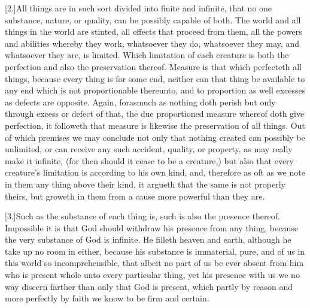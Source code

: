 [2.]All things are in such sort divided into finite and infinite, that no one substance, nature, or quality, can be possibly capable of both. The world and all things in the world are stinted, all effects that proceed from them, all the powers and abilities whereby they work, whatsoever they do, whatsoever they may, and whatsoever they are, is limited. Which limitation  of each creature is both the perfection and also the preservation thereof.
 Measure is that which perfecteth all things, because every thing is for some end, neither can that thing be available to any end which is not proportionable thereunto, and to proportion as well excesses as defects are opposite. Again, forasmuch as nothing doth perish but only through excess or defect of that, the due proportioned measure whereof doth give perfection, it followeth that measure is likewise the preservation of all things. Out of which premises we may conclude not only that nothing created can possibly be unlimited, or can receive any such accident, quality, or property, as may really make it infinite, (for then should it cease to be a creature,) but also that every creature’s limitation is according to his own kind, and, therefore as oft as we note in them any thing above their kind, it argueth that the same is not properly theirs, but groweth in them from a cause more powerful than they are.

[3.]Such as the substance of each thing is, such is also the presence thereof. Impossible it is that God should withdraw his presence from any thing, because the very substance of God is infinite. He filleth heaven and earth, although he take up no room in either, because his substance is immaterial, pure, and of us in this world so incomprehensible, that albeit no part of us be ever absent from him who is present whole unto every particular thing, yet his presence with us we no way discern farther than only that God is present, which partly by reason and more perfectly by faith we know to be firm and certain.

